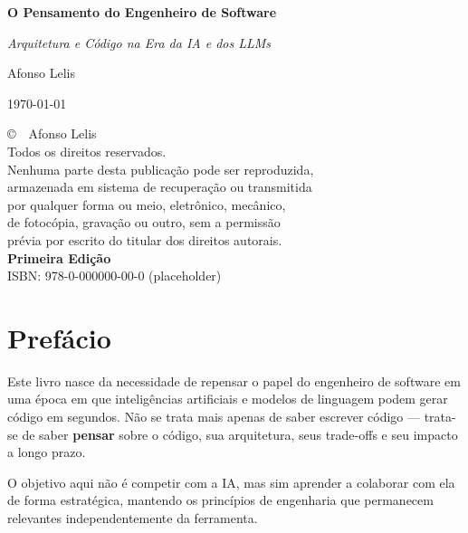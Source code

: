 \documentclass[12pt,a4paper]{book}
\title{\booktitle}
\author{\authorname}
\date{\today}
\newcommand{\booktitle}{O Pensamento do Engenheiro de Software}
\newcommand{\booksubtitle}{Arquitetura e Código na Era da IA e dos LLMs}
\newcommand{\authorname}{Afonso Lelis}
\begin{document}

\frontmatter

\begin{titlepage}
    \centering
    \vspace*{2cm}
    {\Huge\bfseries\booktitle\par}
    \vspace{1cm}
    {\Large\itshape\booksubtitle\par}
    \vspace{2cm}
    {\large\authorname\par}
    \vfill
    {\small\today\par}
\end{titlepage}

\cleardoublepage
\pagestyle{empty}
\begin{center}
    \small
    \copyright\ \the\year\ \authorname\\[0.5cm]
    Todos os direitos reservados.\\
    Nenhuma parte desta publicação pode ser reproduzida,\\
    armazenada em sistema de recuperação ou transmitida\\
    por qualquer forma ou meio, eletrônico, mecânico,\\
    de fotocópia, gravação ou outro, sem a permissão\\
    prévia por escrito do titular dos direitos autorais.\\[1cm]
    \textbf{Primeira Edição}\\[1cm]
    ISBN: 978-0-000000-00-0 (placeholder)
\end{center}

\cleardoublepage
\pagestyle{fancy}
\tableofcontents

\cleardoublepage
\chapter*{Prefácio}

Este livro nasce da necessidade de repensar o papel do engenheiro de software 
em uma época em que inteligências artificiais e modelos de linguagem podem gerar 
código em segundos. Não se trata mais apenas de saber escrever código — trata-se 
de saber \textbf{pensar} sobre o código, sua arquitetura, seus trade-offs e seu 
impacto a longo prazo.

O objetivo aqui não é competir com a IA, mas sim aprender a colaborar com ela 
de forma estratégica, mantendo os princípios de engenharia que permanecem 
relevantes independentemente da ferramenta.
\end{document}
